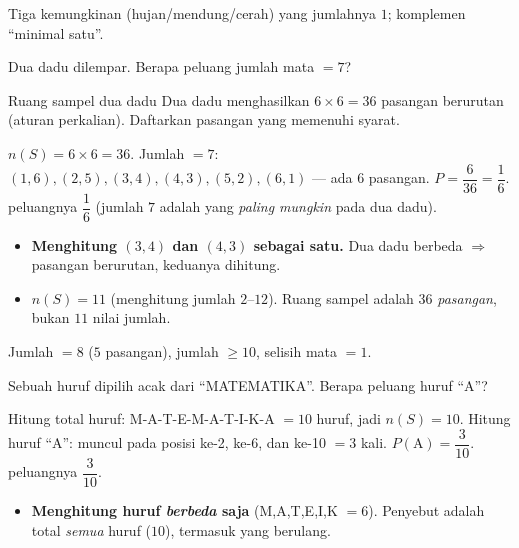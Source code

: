 \begin{variasi}
Tiga kemungkinan (hujan/mendung/cerah) yang jumlahnya $1$; komplemen ``minimal
satu''.
\end{variasi}

\begin{soalbox}{}
Dua dadu dilempar. Berapa peluang jumlah mata $=7$?
\end{soalbox}

\begin{ingat}{Ruang sampel dua dadu}
Dua dadu menghasilkan $6\times6=36$ pasangan berurutan (aturan perkalian).
Daftarkan pasangan yang memenuhi syarat.
\end{ingat}

\jawab
{} $n(S)=6\times6=36$.
 Jumlah $=7$: $(1,6),(2,5),(3,4),(4,3),(5,2),(6,1)$ --- ada $6$
pasangan.
 $P=\dfrac{6}{36}=\dfrac16$.
\jadi peluangnya $\dfrac16$ (jumlah $7$ adalah yang \emph{paling mungkin} pada
dua dadu).

\begin{jebakan}
\begin{itemize}[leftmargin=*,topsep=2pt]
  \item \textbf{Menghitung $(3,4)$ dan $(4,3)$ sebagai satu.} Dua dadu berbeda
  $\Rightarrow$ pasangan berurutan, keduanya dihitung.
  \item \textbf{$n(S)=11$} (menghitung jumlah $2$--$12$). Ruang sampel adalah
  $36$ \emph{pasangan}, bukan $11$ nilai jumlah.
\end{itemize}
\end{jebakan}

\begin{variasi}
Jumlah $=8$ ($5$ pasangan), jumlah $\ge10$, selisih mata $=1$.
\end{variasi}

\begin{soalbox}{}
Sebuah huruf dipilih acak dari ``MATEMATIKA''. Berapa peluang huruf ``A''?
\end{soalbox}

\jawab
{} Hitung total huruf: M-A-T-E-M-A-T-I-K-A $=10$ huruf, jadi $n(S)=10$.
 Hitung huruf ``A'': muncul pada posisi ke-2, ke-6, dan ke-10 $=3$
kali.
 $P(\text{A})=\dfrac{3}{10}$.
\jadi peluangnya $\dfrac{3}{10}$.

\begin{jebakan}
\begin{itemize}[leftmargin=*,topsep=2pt]
  \item \textbf{Menghitung huruf \emph{berbeda} saja} (M,A,T,E,I,K $=6$).
  Penyebut adalah total \emph{semua} huruf ($10$), termasuk yang berulang.
\end{itemize}
\end{jebakan}


